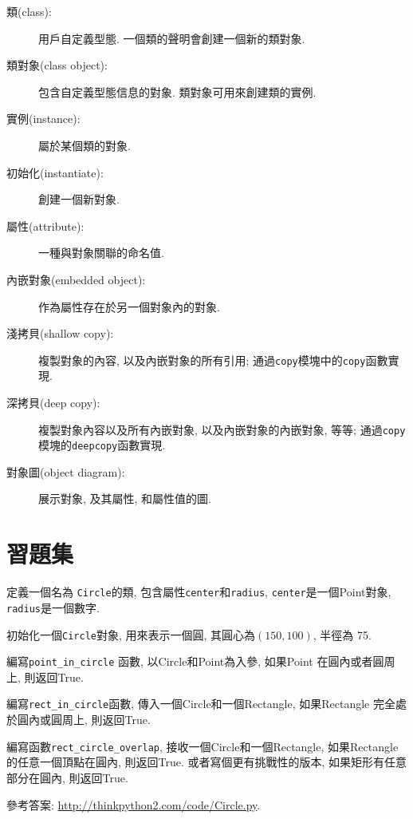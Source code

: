 \documentclass[10pt]{book}
\begin{document}
\begin{description}

\item[類(class):] 用戶自定義型態. 一個類的聲明會創建一個新的類對象. 

\item[類對象(class object):] 包含自定義型態信息的對象. 
類對象可用來創建類的實例. 

\item[實例(instance):] 屬於某個類的對象. 

\item[初始化(instantiate):] 創建一個新對象.

\item[屬性(attribute):] 一種與對象關聯的命名值. 

\item[內嵌對象(embedded object):] 作為屬性存在於另一個對象內的對象. 

\item[淺拷貝(shallow copy):] 複製對象的內容, 以及內嵌對象的所有引用;
通過{\tt copy}模塊中的{\tt copy}函數實現. 

\item[深拷貝(deep copy):] 複製對象內容以及所有內嵌對象, 以及內嵌對象的內嵌對象, 等等;
通過{\tt copy} 模塊的{\tt deepcopy}函數實現. 

\item[對象圖(object diagram):] 展示對象, 及其屬性, 和屬性值的圖. 

\end{description}


\section{習題集}

\begin{exercise}

定義一個名為 {\tt Circle}的類, 包含屬性{\tt center}和{\tt radius}, 
 {\tt center}是一個Point對象, {\tt radius}是一個數字. 

初始化一個{\tt Circle}對象, 用來表示一個圓, 其圓心為$(150, 100)$, 
半徑為 75.

編寫\verb"point_in_circle" 函數, 以Circle和Point為入參, 
如果Point 在圓內或者圓周上, 則返回True. 

編寫\verb"rect_in_circle"函數, 傳入一個Circle和一個Rectangle, 
如果Rectangle 完全處於圓內或圓周上, 則返回True. 

編寫函數\verb"rect_circle_overlap", 接收一個Circle和一個Rectangle, 
如果Rectangle的任意一個頂點在圓內, 則返回True. 
或者寫個更有挑戰性的版本, 如果矩形有任意部分在圓內, 則返回True. 

參考答案: \url{http://thinkpython2.com/code/Circle.py}.

\end{exercise}
\end{document}
